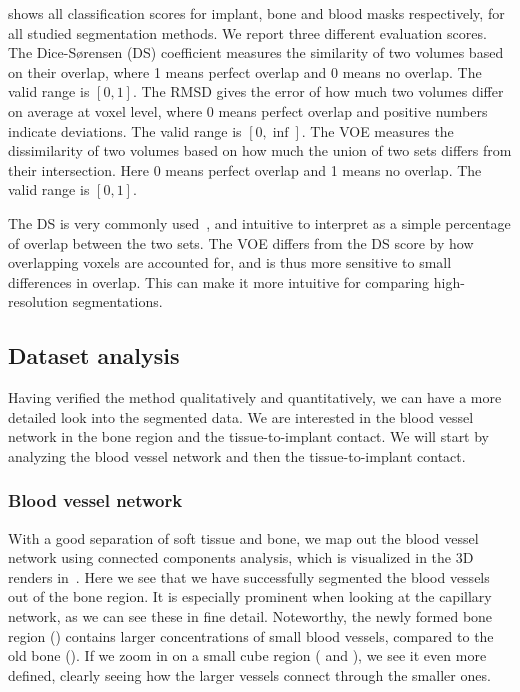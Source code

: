  shows all classification scores for implant, bone and blood masks
respectively, for all studied segmentation methods. We report three different
evaluation scores. The Dice-Sørensen (DS) coefficient measures the similarity
of two volumes based on their overlap, where 1 means perfect overlap and 0
means no overlap. The valid range is $[0,1]$. The RMSD gives the error of how
much two volumes differ on average at voxel level, where 0 means perfect
overlap and positive numbers indicate deviations. The valid range is
$[0,\inf]$. The VOE measures the dissimilarity of two volumes based on how much
the union of two sets differs from their intersection. Here 0 means perfect
overlap and 1 means no overlap. The valid range is $[0,1]$.

The DS is very commonly used~\cite{evaluation_review}, and intuitive to
interpret as a simple percentage of overlap between the two sets. The VOE
differs from the DS score by how overlapping voxels are accounted for, and is
thus more sensitive to small differences in overlap. This can make it more
intuitive for comparing high-resolution segmentations.


\subsection{Dataset analysis}

Having verified the method qualitatively and quantitatively, we can have a more
detailed look into the segmented data. We are interested in the blood vessel
network in the bone region and the tissue-to-implant contact. We will start by
analyzing the blood vessel network and then the tissue-to-implant contact.

\subsubsection{Blood vessel network}
\label{sec:blood-network}

With a good separation of soft tissue and bone, we map out the blood vessel
network using connected components analysis, which is visualized in the 3D
renders in~. Here we see that we have successfully
segmented the blood vessels out of the bone region. It is especially prominent
when looking at the capillary network, as we can see these in fine detail.
Noteworthy, the newly formed bone region () contains
larger concentrations of small blood vessels, compared to the old bone
(). If we zoom in on a small cube region
( and ), we see it even more
defined, clearly seeing how the larger vessels connect through the smaller
ones.

